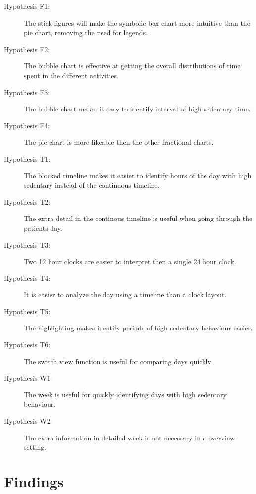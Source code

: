 \begin{description}
\item[Hypothesis F1:] The stick figures will make the symbolic box chart more intuitive than the pie chart, removing the need for legends.

\item[Hypothesis F2:] The bubble chart is effective at getting the overall distributions of time spent in the different activities.

\item[Hypothesis F3:] The bubble chart makes it easy to identify interval of high sedentary time.

\item[Hypothesis F4:] The pie chart is more likeable then the other fractional charts.

\item[Hypothesis T1:] The blocked timeline makes it easier to identify hours of the day with high sedentary instead of the continuous timeline.

\item[Hypothesis T2:] The extra detail in the continous timeline is useful when going through the patients day.

\item[Hypothesis T3:] Two 12 hour clocks are easier to interpret then a single 24 hour clock.

\item[Hypothesis T4:] It is easier to analyze the day using a timeline than a clock layout.

\item[Hypothesis T5:] The highlighting makes identify periods of high sedentary behaviour easier.

\item[Hypothesis T6:] The switch view function is useful for comparing days quickly

\item[Hypothesis W1:] The week is useful for quickly identifying days with high sedentary behaviour.

\item[Hypothesis W2:] The extra information in detailed week is not necessary in a overview setting.

\end{description}



\section{Findings}

